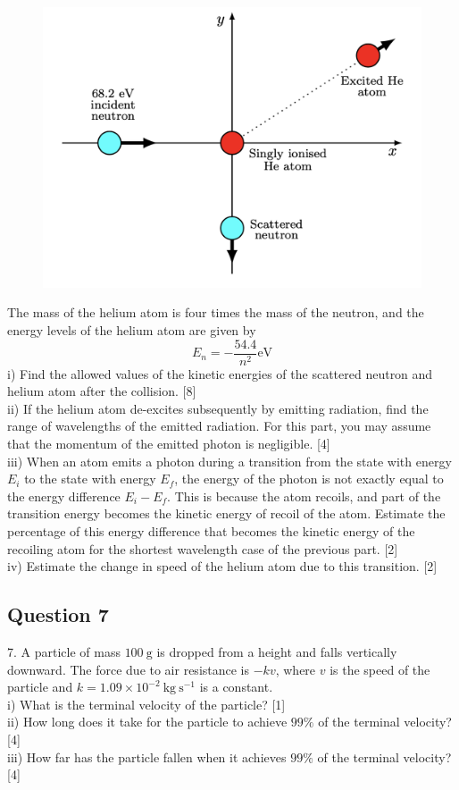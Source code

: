 \documentclass{article}
\begin{document}
\begin{figure}
	\centering
	\includegraphics[width=0.5\linewidth]{spho_book_TYS_images/2018q6.png}
	\caption{}
\end{figure}

The mass of the helium atom is four times the mass of the neutron, and the energy levels of the helium atom are given by
$$
E_{n}=-\frac{54.4}{n^{2}} \mathrm{eV}
$$
i) Find the allowed values of the kinetic energies of the scattered neutron and helium atom after the collision. [8] \\
ii) If the helium atom de-excites subsequently by emitting radiation, find the range of wavelengths of the emitted radiation. For this part, you may assume that the momentum of the emitted photon is negligible. [4] \\
iii) When an atom emits a photon during a transition from the state with energy $E_{i}$ to the state with energy $E_{f}$, the energy of the photon is not exactly equal to the energy difference $E_{i}-E_{f}$. This is because the atom recoils, and part of the transition energy becomes the kinetic energy of recoil of the atom. Estimate the percentage of this energy difference that becomes the kinetic energy of the recoiling atom for the shortest wavelength case of the previous part. [2] \\
iv) Estimate the change in speed of the helium atom due to this transition. [2]

\subsection{Question 7}
7. A particle of mass $100 \mathrm{~g}$ is dropped from a height and falls vertically downward. The force due to air resistance is $-k v$, where $v$ is the speed of the particle and $k=1.09 \times 10^{-2} \mathrm{~kg} \mathrm{~s}^{-1}$ is a constant. \\
i) What is the terminal velocity of the particle? [1] \\
ii) How long does it take for the particle to achieve $99 \%$ of the terminal velocity? [4] \\
iii) How far has the particle fallen when it achieves $99 \%$ of the terminal velocity? [4]
\end{document}
